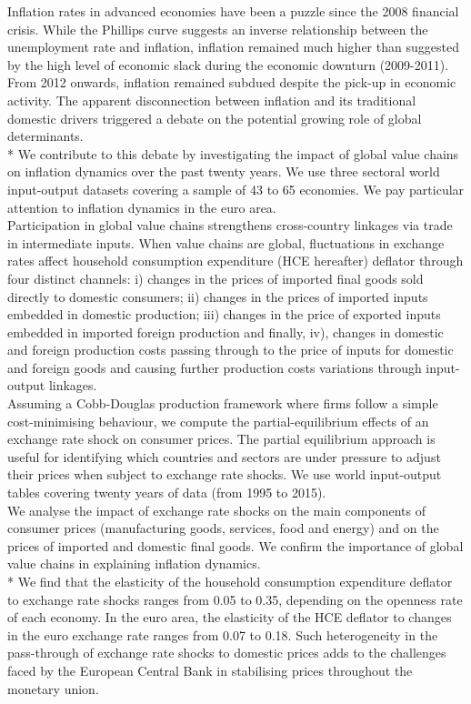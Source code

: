 \documentclass[12pt,a4paper]{article}
\begin{document}
Inflation rates in advanced economies have been a puzzle since the 2008 financial crisis. While the Phillips curve suggests an inverse relationship between the unemployment rate and inflation, inflation remained much higher than suggested by the high level of economic slack during the economic downturn (2009-2011). From 2012 onwards, inflation remained subdued despite the pick-up in economic activity. The apparent disconnection between inflation and its traditional domestic drivers triggered a debate on the potential growing role of global determinants. \\*
We contribute to this debate by investigating the impact of global value chains on inflation dynamics over the past twenty years. We use three sectoral world input-output datasets covering a sample of 43 to 65 economies. We pay particular attention to inflation dynamics in the euro area.\\
Participation in global value chains strengthens cross-country linkages via trade in intermediate inputs. When value chains are global, fluctuations in exchange rates affect household consumption expenditure (HCE hereafter) deflator through four distinct channels: i) changes in the prices of imported final goods sold directly to domestic consumers; ii) changes in the prices of imported inputs embedded in domestic production; iii) changes in the price of exported inputs embedded in imported foreign production and finally, iv), changes in domestic and foreign production costs passing through to the price of inputs for domestic and foreign goods and causing further production costs variations through input-output linkages.\\
Assuming a Cobb-Douglas production framework where firms follow a simple cost-minimising behaviour, we compute the partial-equilibrium effects of an exchange rate shock on consumer prices. The partial equilibrium approach is useful for identifying which countries and sectors are under pressure to adjust their prices when subject to exchange rate shocks. We use world input-output tables covering twenty years of data (from 1995 to 2015).\\
We analyse the impact of exchange rate shocks on the main components of consumer prices (manufacturing goods, services, food and energy) and on the prices of imported and domestic final goods. We confirm the importance of global value chains in explaining inflation dynamics.\\*
We find that the elasticity of the household consumption expenditure deflator to exchange rate shocks ranges from 0.05 to 0.35, depending on the openness rate of each economy. In the euro area, the elasticity of the HCE deflator to changes in the euro exchange rate ranges from 0.07 to 0.18. Such heterogeneity in the pass-through of exchange rate shocks to domestic prices adds to the challenges faced by the European Central Bank in stabilising prices throughout the monetary union. \\
\end{document}
